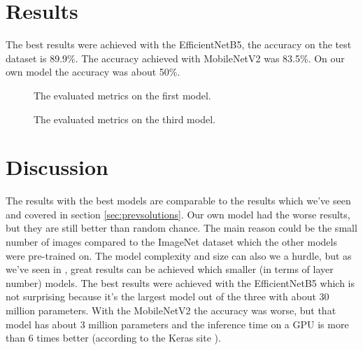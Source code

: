 \documentclass[twocolumn]{article}
\begin{document}
	\section{Results}
	The best results were achieved with the EfficientNetB5, the accuracy on the test dataset is 89.9\%. The accuracy achieved with MobileNetV2 was 83.5\%. On our own model the accuracy was about 50\%.
	
	\begin{figure}
		\centering
		\caption{The evaluated metrics on the first model.}
		\label{model1_metrics}
	\end{figure}
	\begin{figure}
		\centering
		\caption{The evaluated metrics on the third model.}
		\label{model3_metrics}
	\end{figure}
	
	\section{Discussion}
	The results with the best models are comparable to the results which we've seen and covered in section \ref{sec:prevsolutions}.
	Our own model had the worse results, but they are still better than random chance. The main reason could be the small number of images compared to the ImageNet dataset which the other models were pre-trained on. The model complexity and size can also we a hurdle, but as we've seen in \cite{Chu2018}, great results can be achieved which smaller (in terms of layer number) models.
	The best results were achieved with the EfficientNetB5 which is not surprising because it's the largest model out of the three with about 30 million parameters. With the MobileNetV2 the accuracy was worse, but that model has about 3 million parameters and the inference time on a GPU is more than 6 times better (according to the Keras site \cite{keras_applications}).
	
	
	
	
\end{document}
